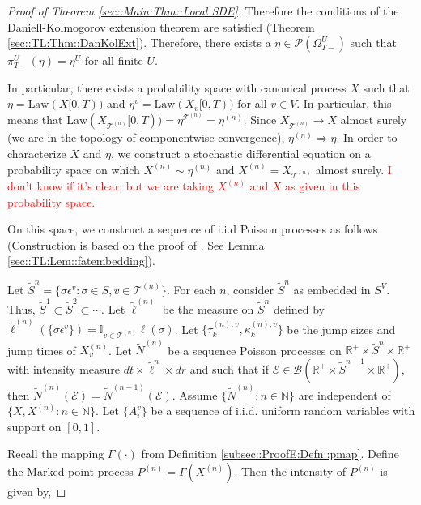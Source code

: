 \documentclass[12pt]{article}
\newcommand{\mb}{\mathbb}
\newcommand{\mc}{\mathcal}
\newcommand{\ms}{\mathscr}
\newcommand{\ra}{\rightarrow}
\newcommand{\te}{\text}
\newcommand{\ep}{\epsilon}
\newcommand{\tr}{\textcolor{red}}
\newcommand{\ind}{\hspace{24pt}}
\renewcommand{\v}{v}							%
\renewcommand{\U}{U}							%
\renewcommand{\S}{S}							%
\newcommand{\s}{\sigma}							%
\newcommand{\ev}{\ep}							%
\newcommand{\T}{T}								%
\renewcommand{\t}{t}							%
\newcommand{\sset}{\Omega}						%
\newcommand{\proj}{\pi}							%
\newcommand{\X}{X}								%
\newcommand{\vind}[1]{^{#1}}					%
\newcommand{\carp}[1]{^{#1}}					%
\newcommand{\vsi}[1]{^{#1}}						%
\newcommand{\cind}[1]{_{#1}}					%
\newcommand{\tip}[1]{#1}						%
\newcommand{\ts}[1]{_{#1}}						%
\newcommand{\slnvind}[2]{^{(#1),#2}}				%
\newcommand{\tree}{\mc{T}}						%
\newcommand{\sln}[1]{^{(#1)}}					%
\newcommand{\poiss}{N}							%
\newcommand{\Sm}{\ell}							%
\renewcommand{\r}{r}							%
\newcommand{\alt}[1]{\widetilde{#1}}			%
\newcommand{\indx}[1]{_{#1}}					%
\newcommand{\mmm}{\eta}							%
\newcommand{\law}{\te{Law}}						%
\newcommand{\rt}{\tau}							%
\renewcommand{\it}{k}							%
\newcommand{\evnt}{\mc{E}}						%
\newcommand{\rv}{A}								%
\newcommand{\pmap}{\Gamma}						%
\renewcommand{\mark}{\kappa}					%
\newcommand{\rp}{P}								%
\begin{document}
\begin{proof}[Proof of Theorem \ref{sec::Main:Thm::Local SDE}]
Therefore the conditions of the Daniell-Kolmogorov extension theorem are satisfied (Theorem \ref{sec::TL:Thm::DanKolExt}). Therefore, there exists a \(\mmm\in \ms{P}(\sset\vsi{\U}\ts{\T-})\) such that \(\proj\vsi{\U}\ts{\T-}(\mmm) =\mmm\vind{\U}\) for all finite \(\U\).

\ind In particular, there exists a probability space with canonical process \(\X\) such that \(\mmm = \law(\X\tip{[0,\T)})\) and \(\mmm\vind{\v} = \law(\X\cind{\v}\tip{[0,\T)})\) for all \(\v \in V\). In particular, this means that \(\law(\X\cind{\tree\sln{n}}\tip{[0,\T)}) = \mmm\vind{\tree\sln{n}} = \mmm\sln{n}\). Since \(\X\cind{\tree\sln{n}} \ra \X\) almost surely (we are in the topology of componentwise convergence), \(\mmm\sln{n} \Rightarrow \mmm\). In order to characterize \(\X\) and \(\mmm\), we construct a stochastic differential equation on a probability space on which \(\X\sln{n} \sim \mmm\sln{n}\) and \(\X\sln{n} = \X\cind{\tree\sln{n}}\) almost surely. \tr{I don't know if it's clear, but we are taking \(\X\sln{n}\) and \(\X\) as given in this probability space.}

\ind On this space, we construct a sequence of i.i.d Poisson processes as follows (Construction is based on the proof of \cite[Theorem 14.7.1(b)]{DalVer08}. See Lemma \ref{sec::TL:Lem::fatembedding}).

\ind Let \(\alt{\S}^n = \{\s\ev\vind{\v}: \s\in\S,\v \in \tree\sln{n}\}\). For each \(n\), consider \(\alt{\S}^n\) as embedded in \(\S\carp{V}\). Thus, \(\alt{\S}^1 \subset \alt{\S}^2 \subset \cdots\). Let \(\alt{\Sm}\sln{n}\) be the measure on \(\alt{\S}^n\) defined by \(\alt{\Sm}\sln{n}(\{\s\ev\vind{\v}\}) = \mb{I}_{\v \in \tree\sln{n}}\Sm(\s)\). Let \(\{\rt\slnvind{n}{\v}\indx{\it},\mark\indx{\it}\slnvind{n}{\v}\}\) be the jump sizes and jump times of \(\X\sln{n}\cind{\v}\). Let \(\alt{\poiss}\sln{n}\) be a sequence Poisson processes on \(\mb{R}^+\times\alt{\S}^n\times \mb{R}^+\) with intensity measure \(d\t\times\alt{\Sm}^n\times d\r\) and such that if \(\evnt \in \ms{B}(\mb{R}^+\times\alt{\S}^{n-1}\times \mb{R}^+)\), then \(\alt{\poiss}\sln{n}(\evnt) = \alt{\poiss}\sln{n-1}(\evnt)\). Assume \(\{\alt{\poiss}\sln{n}:n\in\mb{N}\}\) are independent of \(\{\X,\X\sln{n}:n\in\mb{N}\}\). Let \(\{\rv\vind{\v}\indx{i}\}\) be a sequence of i.i.d. uniform random variables with support on \([0,1]\).

\ind Recall the mapping \(\pmap(\cdot)\) from Definition \ref{subsec::ProofE:Defn::pmap}. Define the Marked point process \(\rp\sln{n} = \pmap(\X\sln{n})\). Then the intensity of \(\rp\sln{n}\) is given by,


\end{proof}
\end{document}
